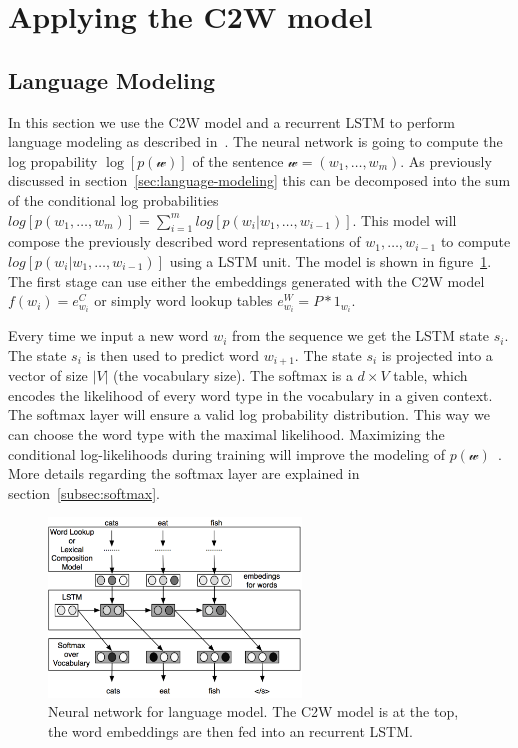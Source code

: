 \section{Applying the C2W model}

\subsection{Language Modeling}
\label{subsec:language-model-c2w}

In this section we use the C2W model and a recurrent LSTM to perform language modeling as 
described in~\cite{DBLP:journals/corr/LingLMAADBT15}.
The neural network is going to compute the log propability $\log[ p(\mathcal{w}) ]$ of the 
sentence $\mathcal{w} = (w_1, \dots, w_m)$. As previously discussed in section~\ref{sec:language-modeling} this can be 
decomposed into the sum of the conditional log probabilities $log[ p(w_1,\dots,w_m) ] = \sum_{i=1}^{m} log[ p(w_i | w_1,\dots,w_{i-1}) ]$.
This model will compose the previously described word representations of $w_1,\dots,w_{i-1}$ to compute 
$log[ p(w_i | w_1,\dots,w_{i-1}) ]$ using a LSTM unit.
The model is shown in figure~\ref{fig:c2w-language-model}. The first stage can use either the embeddings generated with the C2W model
$f(w_i) = e_{w_i}^C $ or simply word lookup tables $e_{w_i}^W = P * 1_{w_i}$.

Every time we input a new word $w_i$ from the sequence we get the LSTM state $s_i$. The state $s_i$ is then used to predict word $w_{i+1}$.
The state $s_i$ is projected into a vector of size $|V|$ (the vocabulary size). The softmax is a $d \times V$ table, 
which encodes the likelihood of every word type in the vocabulary in a given context. 
The softmax layer will ensure a valid log probability distribution. This way we can choose the word type with the maximal likelihood.
Maximizing the conditional log-likelihoods during training will improve the modeling 
of $p(\mathcal{w})$~\cite{DBLP:conf/interspeech/MikolovKBCK10}.
More details regarding the softmax layer are explained in section~\ref{subsec:softmax}.

\begin{figure}[H]
\begin{center}
  \includegraphics[width=0.6\textwidth]{./img/c2w-language-model}
  \caption{Neural network for language model. The C2W model is at the top, the word embeddings are then fed into an recurrent LSTM.}
  \label{fig:c2w-language-model}
\end{center}
\end{figure}


